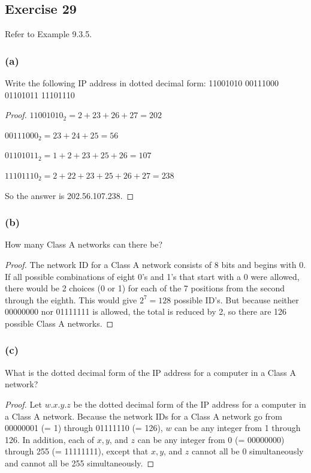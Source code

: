 \documentclass[14pt]{extarticle}
\begin{document}
\subsection{Exercise 29}
Refer to Example 9.3.5.

\subsubsection{(a)}
Write the following IP address in dotted decimal form: 11001010 00111000 01101011 11101110

\begin{proof}
\(11001010_2 = 2 + 23 + 26 + 27 = 202\)

\(00111000_2 = 23 + 24 + 25 = 56\)

\(01101011_2 = 1 + 2 + 23 + 25 + 26 = 107\)

\(11101110_2 = 2 + 22 + 23 + 25 + 26 + 27 = 238\)

So the answer is 202.56.107.238.
\end{proof}

\subsubsection{(b)}
How many Class A networks can there be?

\begin{proof}
The network ID for a Class A network consists of 8 bits and begins with 0. If all possible combinations of eight 0’s 
and 1’s that start with a 0 were allowed, there would be 2 choices (0 or 1) for each of the 7 positions from the 
second through the eighth. This would give \(2^7 = 128\) possible ID’s. But because neither 00000000 nor 01111111 is 
allowed, the total is reduced by 2, so there are 126 possible Class A networks.
\end{proof}

\subsubsection{(c)}
What is the dotted decimal form of the IP address for a computer in a Class A network?

\begin{proof}
Let \(w.x.y.z\) be the dotted decimal form of the IP address for a computer in a Class A network. Because the 
network IDs for a Class A network go from 00000001 (= 1) through 01111110 (= 126), $w$ can be any integer from 1 
through 126. In addition, each of \(x, y\), and \(z\) can be any integer from 0 (= 00000000) through 255 (= 
11111111), except that \(x, y\), and \(z\) cannot all be 0 simultaneously and cannot all be 255 simultaneously.
\end{proof}
\end{document}
